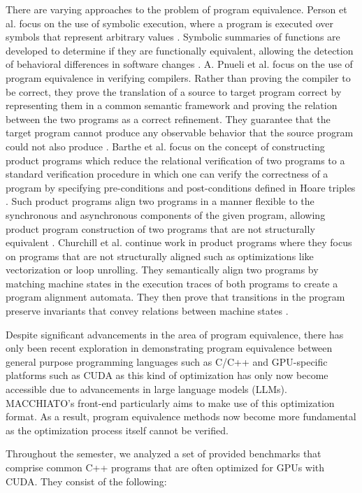 \documentclass{article}
\begin{document}
There are varying approaches to the problem of program equivalence. Person et al. focus on the use of symbolic execution, where a program is executed over symbols that represent arbitrary values \cite{10.1145/360248.360252}. Symbolic summaries of functions are developed to determine if they are functionally equivalent, allowing the detection of behavioral differences in software changes \cite{10.1145/1453101.1453131}. A. Pnueli et al. focus on the use of program equivalence in verifying compilers. Rather than proving the compiler to be correct, they prove the translation of a source to target program correct by representing them in a common semantic framework and proving the relation between the two programs as a correct refinement. They guarantee that the target program cannot produce any observable behavior that the source program could not also produce \cite{10.1007/BFb0054170}. Barthe et al. focus on the concept of constructing product programs which reduce the relational verification of two programs to a standard verification procedure in which one can verify the correctness of a program by specifying pre-conditions and post-conditions defined in Hoare triples \cite{10.1145/357980.358001}. Such product programs align two programs in a manner flexible to the synchronous and asynchronous components of the given program, allowing product program construction of two programs that are not structurally equivalent \cite{Barthe2011RelationalVU}. Churchill et al. continue work in product programs where they focus on programs that are not structurally aligned such as optimizations like vectorization or loop unrolling. 
They semantically align two programs by matching machine states in the execution traces of both programs to create a program alignment automata. They then prove that transitions in the program preserve invariants that convey relations between machine states \cite{10.1145/3314221.3314596}.

Despite significant advancements in the area of program equivalence, there has only been recent exploration in demonstrating program equivalence between general purpose programming languages such as C/C++ and GPU-specific platforms such as CUDA as this kind of optimization has only now become accessible due to advancements in large language models (LLMs). MACCHIATO's front-end particularly aims to make use of this optimization format. As a result, program equivalence methods now become more fundamental as the optimization process itself cannot be verified. 

Throughout the semester, we analyzed a set of provided benchmarks that comprise common C++ programs that are often optimized for GPUs with CUDA. They consist of the following:
\end{document}
